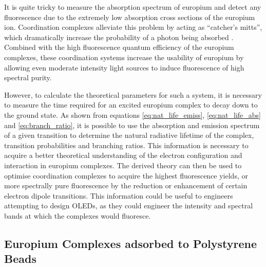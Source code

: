 It is quite tricky to measure the absorption spectrum of europium
and detect any fluorescence due to the extremely low absorption
cross sections of the europium ion. Coordination complexes
alleviate this problem by acting as ``catcher's mitts'', which
dramatically increase the probability of a photon being absorbed
\cite{Kirby:1983cl,Sveshnikova:2000cr,Werts:2002fs,Bunzli:2005ic,Moudam:2009in,Wilson:2010hs,Harma:2010dm,InstituteofBiomedicine:2011vt,Pihlasalo:2012cq}.
Combined with the high fluorescence quantum efficiency of the europium
complexes, these coordination systems increase the usability of europium by
allowing even moderate intensity light sources to induce fluorescence of high
spectral purity.

However, to calculate the theoretical parameters for such a system, it is
necessary to measure the time required for an excited europium complex to decay
down to the ground state. As shown from equations \eqref{eq:nat_life_emiss},
\eqref{eq:nat_life_abs} and \eqref{eq:branch_ratio}, it is possible to use the
absorption and emission spectrum of a given transition to determine the natural
radiative lifetime of the complex, transition probabilities and branching
ratios. This information is necessary to acquire a better theoretical
understanding of the electron configuration and interaction in europium
complexes. The derived theory can then be used to optimise coordination
complexes to acquire the highest fluorescence yields, or more spectrally pure
fluorescence by the reduction or enhancement of certain electron dipole
transitions. This information could be useful to engineers attempting to design
\acp{OLED}, as they could engineer the intensity and spectral bands at which
the complexes would fluoresce.



\subsection{Europium Complexes adsorbed to Polystyrene Beads}\label{subsec:eu_beads}

